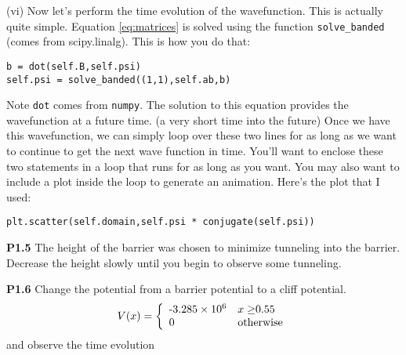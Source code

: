 \begin{minipage}{0.9\linewidth}
\noindent(vi) Now let's perform the time evolution of the wavefunction.  This
is actually quite simple.  Equation \eqref{eq:matrices} is solved
using the function \verb!solve_banded! (comes from scipy.linalg).  This
is how you do that:

\begin{verbatim}
b = dot(self.B,self.psi)
self.psi = solve_banded((1,1),self.ab,b)
\end{verbatim}

Note \verb!dot! comes from \verb!numpy!.
The solution to this equation provides the wavefunction at a future
time. (a very short time into the future) Once we have this
wavefunction, we can simply loop over these two lines for as long as
we want to continue to get the next wave function in time.  You'll
want to enclose these two statements in a loop that runs for as long
as you want.  You may also want to include a plot inside the loop to
generate an animation.  Here's the plot that I used:

\begin{verbatim}
plt.scatter(self.domain,self.psi * conjugate(self.psi))
\end{verbatim}            

\end{minipage}

\vspace{0.25in}

\begin{minipage}{0.9\linewidth}
 \noindent \textbf{P1.5} The height of the barrier was chosen to
minimize tunneling into the barrier.  Decrease the height slowly until
you begin to observe some tunneling.
\end{minipage}

\vspace{0.25in}

\begin{minipage}{0.9\linewidth}
 \noindent \textbf{P1.6} Change the potential from a barrier potential
 to a cliff potential.
\[ V(x) = \left\{\begin{array}{ll}
      $-\num{3.285e6}$ & x\geq $0.55$ \\
      0 & \mathrm{otherwise} 
\end{array}\right. \]
and observe the time evolution
\end{minipage}
      